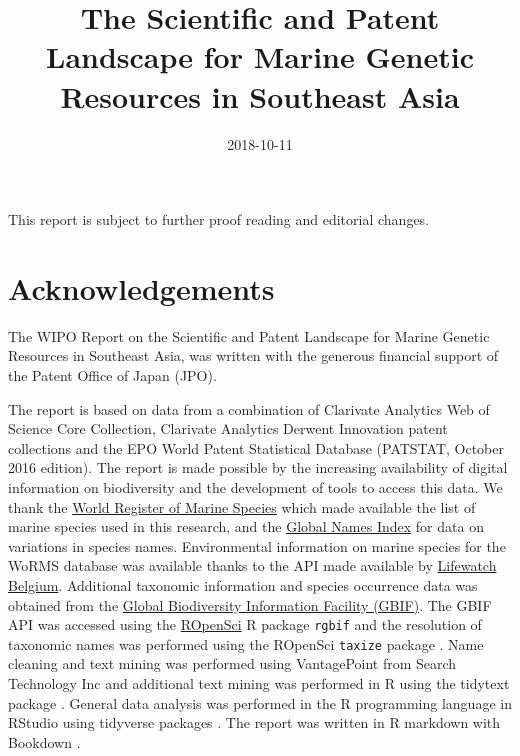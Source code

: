 \documentclass[]{book}
\title{The Scientific and Patent Landscape for Marine Genetic Resources in
Southeast Asia}
\date{2018-10-11}
\theoremstyle{definition}
\theoremstyle{definition}
\theoremstyle{definition}
\theoremstyle{remark}
\begin{document}
\maketitle

{
\setcounter{tocdepth}{1}
\tableofcontents
}
\hypertarget{section}{%
\chapter*{}\label{section}}

This report is subject to further proof reading and editorial changes.

\hypertarget{acknowledgements}{%
\chapter*{Acknowledgements}\label{acknowledgements}}

The WIPO Report on the Scientific and Patent Landscape for Marine
Genetic Resources in Southeast Asia, was written with the generous
financial support of the Patent Office of Japan (JPO).

The report is based on data from a combination of Clarivate Analytics
Web of Science Core Collection, Clarivate Analytics Derwent Innovation
patent collections and the EPO World Patent Statistical Database
(PATSTAT, October 2016 edition). The report is made possible by the
increasing availability of digital information on biodiversity and the
development of tools to access this data. We thank the
\href{http://www.marinespecies.org/}{World Register of Marine Species}
which made available the list of marine species used in this research,
and the \href{http://gni.globalnames.org/}{Global Names Index} for data
on variations in species names. Environmental information on marine
species for the WoRMS database was available thanks to the API made
available by
\href{http://www.lifewatch.be/data-services/?cache=1521050271}{Lifewatch
Belgium}. Additional taxonomic information and species occurrence data
was obtained from the \href{https://www.gbif.org/}{Global Biodiversity
Information Facility (GBIF)}. The GBIF API was accessed using the
\href{https://ropensci.org/}{ROpenSci} R package \texttt{rgbif} and the
resolution of taxonomic names was performed using the ROpenSci
\texttt{taxize} package \citep{R-rgbif, R-taxize}. Name cleaning and
text mining was performed using VantagePoint from Search Technology Inc
and additional text mining was performed in R using the tidytext package
\citep{R-tidytext}. General data analysis was performed in the R
programming language in RStudio using tidyverse packages
\citep{R-base, R-tidyverse}. The report was written in R markdown with
Bookdown \citep{R-rmarkdown, R-bookdown}.
\end{document}

